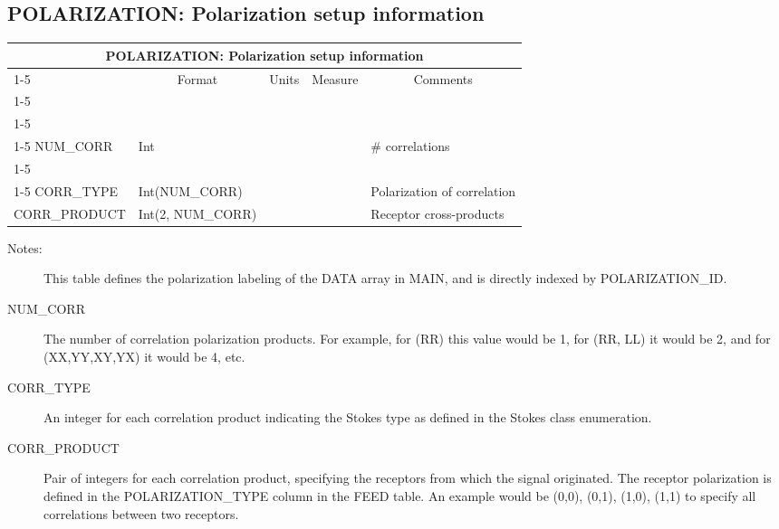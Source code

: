 \documentclass{article}
\newcommand{\defline}[1]{\cline{1-5}
\multicolumn{5}{|l|}{#1} \\
\cline{1-5}}
\newcommand{\definetable}[2]
{
	\vfill\newpage
	\subsection{#1}
        \vspace{0.15in}
        \small
	\begin{tabular}{|l|p{1.25in}|l|p{.9in}|p{1.4in}|}
	\hline
	\multicolumn{5}{|c|}{\bf #1}\\ 
	\cline{1-5}
        \multicolumn{1}{|c|}{Name}&\multicolumn{1}{|c|}{Format}&
        \multicolumn{1}{|c|}{Units}&\multicolumn{1}{|c|}{Measure}&
        \multicolumn{1}{|c|}{Comments}\\
        \cline{1-5}
        #2
        \hline
	\end{tabular}
}
\begin{document}
\definetable{POLARIZATION: Polarization setup information}{
\defline{\bf Columns}
\defline{\em Data description columns}
NUM\_CORR   &     Int  &           &        & \# correlations\\
\defline{\em Data}  
CORR\_TYPE & Int(NUM\_CORR) & & & Polarization of correlation \\
CORR\_PRODUCT &  Int(2, NUM\_CORR) &  & & Receptor cross-products \\  
}
\begin{description}

\item[Notes:] This table defines the polarization labeling of the DATA
array in MAIN, and is directly indexed by  POLARIZATION\_ID.

\item[NUM\_CORR] The number of correlation polarization products. For
example, for (RR) this value would be 1, for (RR, LL) it would be 2,
and for (XX,YY,XY,YX) it would be 4, etc.

\item[CORR\_TYPE] An integer for each correlation product indicating
the Stokes type as defined in the Stokes class enumeration.

\item[CORR\_PRODUCT] Pair of integers for each correlation product,
specifying the receptors from which the signal originated.  The
receptor polarization is defined in the POLARIZATION\_TYPE column in
the FEED table. An example would be (0,0), (0,1), (1,0), (1,1) to
specify all correlations between two receptors.

\end{description}
\end{document}
